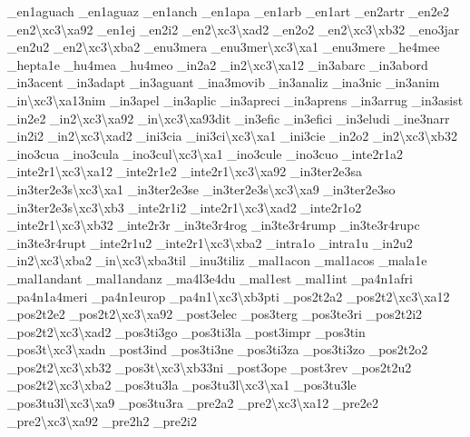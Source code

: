 {\-\_\-en1aguach \-\_\-en1aguaz \-\_\-en1anch \-\_\-en1apa \-\_\-en1arb \-\_\-en1art \-\_\-en2artr \-\_\-en2e2 \-\_\-en2\textbackslash{}xc3\textbackslash{}xa92 \-\_\-en1ej \-\_\-en2i2 \-\_\-en2\textbackslash{}xc3\textbackslash{}xad2 \-\_\-en2o2 \-\_\-en2\textbackslash{}xc3\textbackslash{}xb32 \-\_\-eno3jar \-\_\-en2u2 \-\_\-en2\textbackslash{}xc3\textbackslash{}xba2 \-\_\-enu3mera \-\_\-enu3mer\textbackslash{}xc3\textbackslash{}xa1 \-\_\-enu3mere \-\_\-he4mee \-\_\-hepta1e \-\_\-hu4mea \-\_\-hu4meo \-\_\-in2a2 \-\_\-in2\textbackslash{}xc3\textbackslash{}xa12 \-\_\-in3abarc \-\_\-in3abord \-\_\-in3acent \-\_\-in3adapt \-\_\-in3aguant \-\_\-ina3movib \-\_\-in3analiz \-\_\-ina3nic \-\_\-in3anim \-\_\-in\textbackslash{}xc3\textbackslash{}xa13nim \-\_\-in3apel \-\_\-in3aplic \-\_\-in3apreci \-\_\-in3aprens \-\_\-in3arrug \-\_\-in3asist \-\_\-in2e2 \-\_\-in2\textbackslash{}xc3\textbackslash{}xa92 \-\_\-in\textbackslash{}xc3\textbackslash{}xa93dit \-\_\-in3efic \-\_\-in3efici \-\_\-in3eludi \-\_\-ine3narr \-\_\-in2i2 \-\_\-in2\textbackslash{}xc3\textbackslash{}xad2 \-\_\-ini3cia \-\_\-ini3ci\textbackslash{}xc3\textbackslash{}xa1 \-\_\-ini3cie \-\_\-in2o2 \-\_\-in2\textbackslash{}xc3\textbackslash{}xb32 \-\_\-ino3cua \-\_\-ino3cula \-\_\-ino3cul\textbackslash{}xc3\textbackslash{}xa1 \-\_\-ino3cule \-\_\-ino3cuo \-\_\-inte2r1a2 \-\_\-inte2r1\textbackslash{}xc3\textbackslash{}xa12 \-\_\-inte2r1e2 \-\_\-inte2r1\textbackslash{}xc3\textbackslash{}xa92 \-\_\-in3ter2e3sa \-\_\-in3ter2e3s\textbackslash{}xc3\textbackslash{}xa1 \-\_\-in3ter2e3se \-\_\-in3ter2e3s\textbackslash{}xc3\textbackslash{}xa9 \-\_\-in3ter2e3so \-\_\-in3ter2e3s\textbackslash{}xc3\textbackslash{}xb3 \-\_\-inte2r1i2 \-\_\-inte2r1\textbackslash{}xc3\textbackslash{}xad2 \-\_\-inte2r1o2 \-\_\-inte2r1\textbackslash{}xc3\textbackslash{}xb32 \-\_\-inte2r3r \-\_\-in3te3r4rog \-\_\-in3te3r4rump \-\_\-in3te3r4rupc \-\_\-in3te3r4rupt \-\_\-inte2r1u2 \-\_\-inte2r1\textbackslash{}xc3\textbackslash{}xba2 \-\_\-intra1o \-\_\-intra1u \-\_\-in2u2 \-\_\-in2\textbackslash{}xc3\textbackslash{}xba2 \-\_\-in\textbackslash{}xc3\textbackslash{}xba3til \-\_\-inu3tiliz \-\_\-mal1acon \-\_\-mal1acos \-\_\-mala1e \-\_\-mal1andant \-\_\-mal1andanz \-\_\-ma4l3e4du \-\_\-mal1est \-\_\-mal1int \-\_\-pa4n1afri \-\_\-pa4n1a4meri \-\_\-pa4n1europ \-\_\-pa4n1\textbackslash{}xc3\textbackslash{}xb3pti \-\_\-pos2t2a2 \-\_\-pos2t2\textbackslash{}xc3\textbackslash{}xa12 \-\_\-pos2t2e2 \-\_\-pos2t2\textbackslash{}xc3\textbackslash{}xa92 \-\_\-post3elec \-\_\-pos3terg \-\_\-pos3te3ri \-\_\-pos2t2i2 \-\_\-pos2t2\textbackslash{}xc3\textbackslash{}xad2 \-\_\-pos3ti3go \-\_\-pos3ti3la \-\_\-post3impr \-\_\-pos3tin \-\_\-pos3t\textbackslash{}xc3\textbackslash{}xadn \-\_\-post3ind \-\_\-pos3ti3ne \-\_\-pos3ti3za \-\_\-pos3ti3zo \-\_\-pos2t2o2 \-\_\-pos2t2\textbackslash{}xc3\textbackslash{}xb32 \-\_\-pos3t\textbackslash{}xc3\textbackslash{}xb33ni \-\_\-post3ope \-\_\-post3rev \-\_\-pos2t2u2 \-\_\-pos2t2\textbackslash{}xc3\textbackslash{}xba2 \-\_\-pos3tu3la \-\_\-pos3tu3l\textbackslash{}xc3\textbackslash{}xa1 \-\_\-pos3tu3le \-\_\-pos3tu3l\textbackslash{}xc3\textbackslash{}xa9 \-\_\-pos3tu3ra \-\_\-pre2a2 \-\_\-pre2\textbackslash{}xc3\textbackslash{}xa12 \-\_\-pre2e2 \-\_\-pre2\textbackslash{}xc3\textbackslash{}xa92 \-\_\-pre2h2 \-\_\-pre2i2 }
